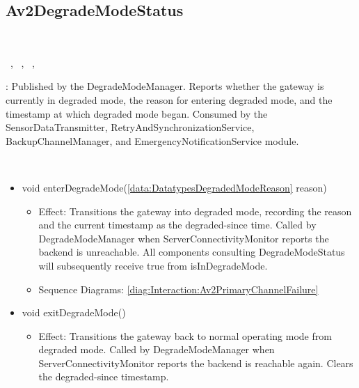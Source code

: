   \subsection{Av2DegradeModeStatus}\label{int:InterfacesAv2DegradeModeStatus}
    \begin{description}
      \item[Provided by:] \iconcomponent{}~
      \item[Required by:] \iconcomponent{}~, \iconcomponent{}~, \iconcomponent{}~, \iconcomponent{}~ 
           \item[Description]: Published by the DegradeModeManager. Reports whether the gateway is currently in degraded mode, the reason for entering degraded mode, and the timestamp at which degraded mode began. Consumed by the SensorDataTransmitter, RetryAndSynchronizationService, BackupChannelManager, and EmergencyNotificationService module.
      \item[Operations:] ~
    \begin{itemize}[noitemsep,nolistsep,leftmargin=-.25cm]
      \item \textsf{void enterDegradeMode(\ref{data:DatatypesDegradedModeReason} reason)}
        \begin{itemize}[noitemsep,nolistsep]
           \item Effect: Transitions the gateway into degraded mode, recording the reason and the current timestamp as the degraded-since time. Called by DegradeModeManager when ServerConnectivityMonitor reports the backend is unreachable. All components consulting DegradeModeStatus will subsequently receive true from isInDegradeMode. 
           \item Sequence Diagrams: \cref{diag:Interaction:Av2PrimaryChannelFailure}
        \end{itemize}
      \item \textsf{void exitDegradeMode()}
        \begin{itemize}[noitemsep,nolistsep]
           \item Effect: Transitions the gateway back to normal operating mode from degraded mode. Called by DegradeModeManager when ServerConnectivityMonitor reports the backend is reachable again. Clears the degraded-since timestamp. 

\end{itemize}
\end{itemize}
\end{description}
